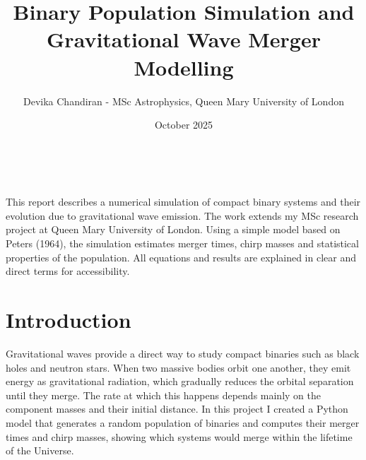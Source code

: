 \documentclass[12pt,a4paper]{article}
\begin{document}
\title{\textbf{Binary Population Simulation and Gravitational Wave Merger Modelling}}\\[6pt]
\author{Devika Chandiran - MSc Astrophysics, Queen Mary University of London}
\date{October 2025}
\makeatletter
\renewenvironment{abstract}{%
    \small
    \begin{center}
      {\bfseries \abstractname\vspace{-.5em}\vspace{\z@}}
    \end{center}
    \list{}{\leftmargin=0.0cm \rightmargin=0.0cm}
    \item\relax
}{\endlist}
\makeatother

\maketitle

\begin{abstract}
    

    

This report describes a numerical simulation of compact binary systems and their evolution due to gravitational wave emission. The work extends my MSc research project at Queen Mary University of London. Using a simple model based on Peters (1964), the simulation estimates merger times, chirp masses and statistical properties of the population. All equations and results are explained in clear and direct terms for accessibility.
\end{abstract}

\section{Introduction}
Gravitational waves provide a direct way to study compact binaries such as black holes and neutron stars. 
When two massive bodies orbit one another, they emit energy as gravitational radiation, which gradually reduces the orbital separation until they merge. 
The rate at which this happens depends mainly on the component masses and their initial distance. 
In this project I created a Python model that generates a random population of binaries and computes their merger times and chirp masses, showing which systems would merge within the lifetime of the Universe.

\end{document}
